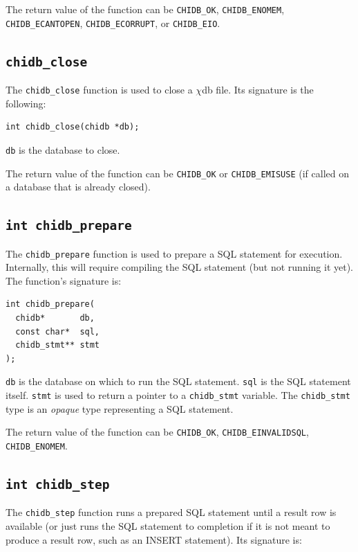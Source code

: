 \documentclass[10pt]{article}
\newcommand{\chidb}{$\chi$\textsf{db}}
\begin{document}
The return value of the function can be \verb+CHIDB_OK+, \verb+CHIDB_ENOMEM+, \verb+CHIDB_ECANTOPEN+, \verb+CHIDB_ECORRUPT+, or \verb+CHIDB_EIO+.

\subsection{\texttt{chidb\_close}}

The \verb+chidb_close+ function is used to close a \chidb{} file. Its signature is the following:

\begin{verbatim}
int chidb_close(chidb *db); 
\end{verbatim}

\texttt{db} is the database to close.

The return value of the function can be \verb+CHIDB_OK+ or \verb+CHIDB_EMISUSE+ (if called on a database that is already closed).


\subsection{\texttt{int chidb\_prepare}}

The \verb+chidb_prepare+ function is used to prepare a SQL statement for execution. Internally, this will require compiling the SQL statement (but not running it yet). The function's signature is:

\begin{verbatim}
int chidb_prepare(
  chidb*       db, 
  const char*  sql, 
  chidb_stmt** stmt
);
\end{verbatim}

\texttt{db} is the database on which to run the SQL statement. \texttt{sql} is the SQL statement itself. \texttt{stmt} is used to return a pointer to a \verb+chidb_stmt+ variable. The \verb+chidb_stmt+ type is an \emph{opaque} type representing a SQL statement.

The return value of the function can be \verb+CHIDB_OK+, \verb+CHIDB_EINVALIDSQL+, \verb+CHIDB_ENOMEM+.

\subsection{\texttt{int chidb\_step}}

The \verb+chidb_step+ function runs a prepared SQL statement until a result row is available (or just runs the SQL statement to completion if it is not meant to produce a result row, such as an INSERT statement). Its signature is: 
\end{document}
